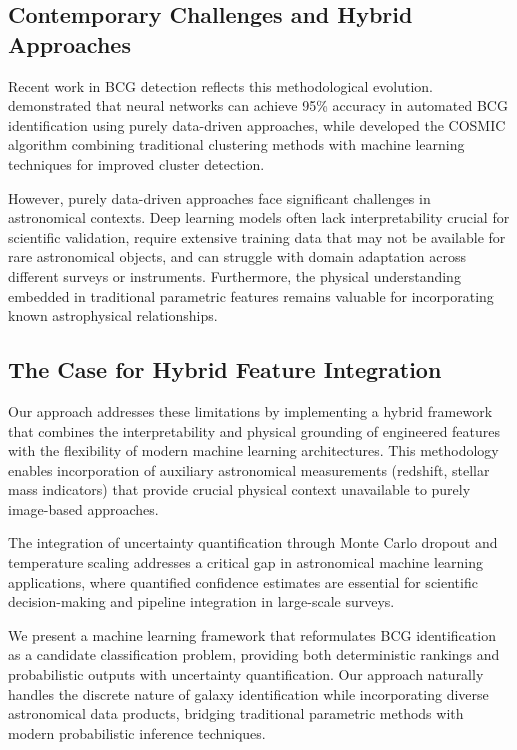\documentclass[twocolumn,10pt]{aastex631}
\begin{document}
\subsection{Contemporary Challenges and Hybrid Approaches}

Recent work in BCG detection reflects this methodological evolution. \citet{Janulewicz2025BCG} demonstrated that neural networks can achieve 95\% accuracy in automated BCG identification using purely data-driven approaches, while \citet{COSMIC2024} developed the COSMIC algorithm combining traditional clustering methods with machine learning techniques for improved cluster detection.

However, purely data-driven approaches face significant challenges in astronomical contexts. Deep learning models often lack interpretability crucial for scientific validation, require extensive training data that may not be available for rare astronomical objects, and can struggle with domain adaptation across different surveys or instruments. Furthermore, the physical understanding embedded in traditional parametric features remains valuable for incorporating known astrophysical relationships.

\subsection{The Case for Hybrid Feature Integration}

Our approach addresses these limitations by implementing a hybrid framework that combines the interpretability and physical grounding of engineered features with the flexibility of modern machine learning architectures. This methodology enables incorporation of auxiliary astronomical measurements (redshift, stellar mass indicators) that provide crucial physical context unavailable to purely image-based approaches.

The integration of uncertainty quantification through Monte Carlo dropout \citep{Laves2019WellCalibratedMU} and temperature scaling addresses a critical gap in astronomical machine learning applications, where quantified confidence estimates are essential for scientific decision-making and pipeline integration in large-scale surveys.

We present a machine learning framework that reformulates BCG identification as a candidate classification problem, providing both deterministic rankings and probabilistic outputs with uncertainty quantification. Our approach naturally handles the discrete nature of galaxy identification while incorporating diverse astronomical data products, bridging traditional parametric methods with modern probabilistic inference techniques.
\end{document}

